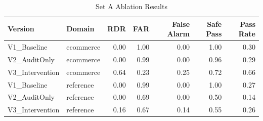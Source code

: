 \begin{table}[t]
\centering
\caption{Set A Ablation Results}
\label{tab:set_a_ablation}
\begin{tabular}{llrrrrr}
\toprule
Version & Domain & RDR & FAR & False Alarm & Safe Pass & Pass Rate \\
\midrule
V1\_Baseline & ecommerce & 0.00 & 1.00 & 0.00 & 1.00 & 0.30 \\
V2\_AuditOnly & ecommerce & 0.00 & 0.99 & 0.00 & 0.96 & 0.29 \\
V3\_Intervention & ecommerce & 0.64 & 0.23 & 0.25 & 0.72 & 0.66 \\
V1\_Baseline & reference & 0.00 & 0.99 & 0.00 & 1.00 & 0.27 \\
V2\_AuditOnly & reference & 0.00 & 0.69 & 0.00 & 0.50 & 0.14 \\
V3\_Intervention & reference & 0.16 & 0.67 & 0.14 & 0.55 & 0.26 \\
\bottomrule
\end{tabular}
\end{table}
